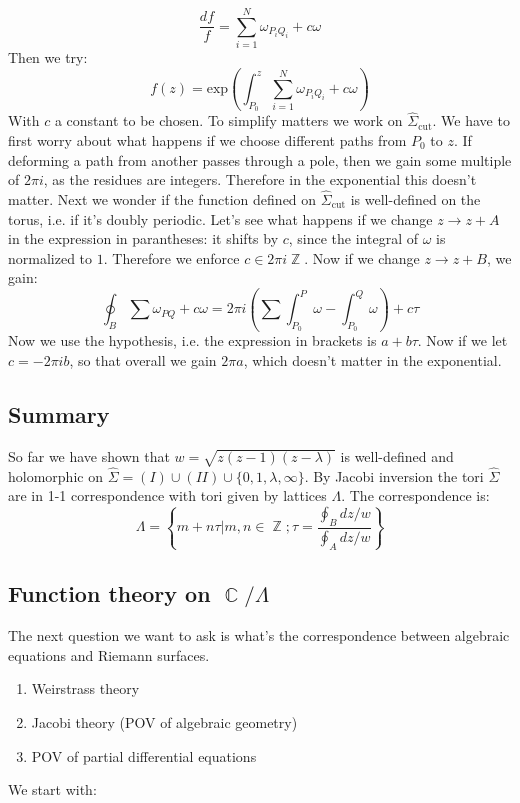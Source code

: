 \documentclass[12 pt]{article}
\DeclareMathOperator {\C} {\mathbb{C}}
\DeclareMathOperator {\Z} {\mathbb{Z}}
\theoremstyle{plain}
\theoremstyle{definition}
\theoremstyle{remark}
\begin{document}
\[      \frac{df}{f} =   \sum_{i=1}^N \omega_{P_i Q_i}  + c \omega  \]
Then we try:
\[      f(z) = \text{exp} \left( \int_{P_0}^z \sum_{i=1}^N \omega_{P_i Q_i}  + c \omega  \right)      \]
With $c$ a constant to be chosen. To simplify matters we work on $\hat \Sigma_{\text{cut}}$. We have to first worry about what happens if we choose different paths from $P_0$ to $z$. If deforming a path from another passes through a pole, then we gain some multiple of $2\pi i$, as the residues are integers. Therefore in the exponential this doesn't matter. Next we wonder if the function defined on $\hat \Sigma_{\text{cut}}$ is well-defined on the torus, i.e. if it's doubly periodic. Let's see what happens if we change $z\to z+A$ in the expression in parantheses: it shifts by $c$, since the integral of $\omega$ is normalized to $1$. Therefore we enforce $c \in 2\pi i \Z$. Now if we change $z \to z+B$, we gain:
\[     \oint_B \sum \omega_{PQ} + c\omega  = 2\pi i \left( \sum \int_{P_0}^{P} \omega - \int_{P_0}^Q \omega    \right)  + c \tau    \]
Now we use the hypothesis, i.e. the expression in brackets is $a + b\tau$. Now if we let $c = -2\pi i b$, so that overall we gain $2\pi a$, which doesn't matter in the exponential.

\subsection*{Summary}
So far we have shown that $w = \sqrt{z(z-1)(z-\lambda)}$ is well-defined and holomorphic on $\hat \Sigma = (I) \cup (II) \cup \{0,1,\lambda, \infty\}$. By Jacobi inversion the tori $\hat \Sigma$ are in 1-1 correspondence with tori given by lattices $\Lambda$. The correspondence is:
\[     \Lambda = \left\{ m + n \tau | m,n\in \Z ; \tau =  \frac{\oint_B dz/w}{\oint_A dz/w} \right\}      \]


\subsection*{Function theory on $\C/\Lambda$}
The next question we want to ask is what's the correspondence between algebraic equations and Riemann surfaces.
\begin{enumerate}
\item Weirstrass theory
\item Jacobi theory (POV of algebraic geometry)
\item POV of partial differential equations
\end{enumerate}
We start with:
\end{document}
